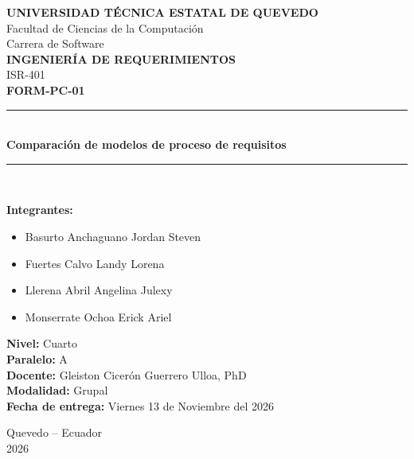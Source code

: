 \documentclass[12pt,a4paper]{article}
\begin{document}
\begin{titlepage}
    \centering

    {\large \textbf{UNIVERSIDAD TÉCNICA ESTATAL DE QUEVEDO}}\\[0.3cm]
    {\large Facultad de Ciencias de la Computación}\\
    {\large Carrera de Software}\\[1.5cm]

    {\Large \textbf{INGENIERÍA DE REQUERIMIENTOS}}\\[0.5cm]
    {\large ISR-401}\\[1.5cm]

    {\LARGE \textbf{FORM-PC-01}}\\[0.9cm]

    \rule{0.85\textwidth}{0.5pt}\\[0.5cm]

    {\large \textbf{Comparación de modelos de proceso de requisitos}}\\

    \rule{0.85\textwidth}{0.5pt}\\[1.5cm]

    \begin{flushleft}
        \textbf{Integrantes:}
        \begin{itemize}[noitemsep,topsep=2pt]
            \item Basurto Anchaguano Jordan Steven
            \item Fuertes Calvo Landy Lorena
            \item Llerena Abril Angelina Julexy
            \item Monserrate Ochoa Erick Ariel
        \end{itemize}
        \vspace{0.2cm}
        \textbf{Nivel:} Cuarto\\[0.4cm]
        \textbf{Paralelo:} A\\[0.4cm]
        \textbf{Docente:} Gleiston Cicerón Guerrero Ulloa, PhD\\[0.4cm]
        \textbf{Modalidad:} Grupal\\[0.4cm]
        \textbf{Fecha de entrega:} Viernes 13 de Noviembre del 2026
    \end{flushleft}

    \vfill

    {\large Quevedo -- Ecuador}\\
    {\large 2026}

\end{titlepage}
\end{document}
